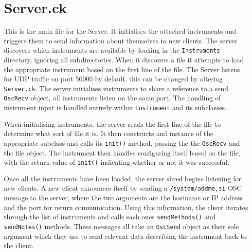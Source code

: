 \documentclass[11pt]{article}
\begin{document}
\section{Server.ck}

This is the main file for the Server. It initialises the attached instruments and triggers them to send information about themselves to new clients.
The server discovers which instruments are available by looking in the \texttt{Instruments} directory, ignoring all subdirectories. When it discovers
a file it attempts to load the appropriate instrument based on the first line of the file. The Server listens for UDP traffic on port 50000 by default, this can be 
changed by altering \texttt{Server.ck}. The server initialises instruments to share a reference to a send \texttt{OscRecv} object, all instruments listen on the same 
port. The handling of instrument input is handled entirely within \texttt{Instrument} and its subclasses. 

When initialising instruments, the server reads the first line of the file to determine what sort of file it is. It then constructs and instance of the appropriate subclass
and calls its \texttt{init()} method, passing the the \texttt{OscRecv} and the file object. The instrument then handles configuring itself based on the file, with the 
return value of \texttt{init()} indicating whether or not it was successful.

Once all the instruments have been loaded, the server shred begins listening for new clients. A new client announces itself by sending a \texttt{/system/addme,si} 
OSC message to the server, where the two arguments are the hostname or IP address and the port for return communication. Using this information, the client 
iterates through the list of instruments and calls each ones \texttt{sendMethods()} and \texttt{sendNotes()} methods. These messages all take an \texttt{OscSend}
object as their sole argument which they use to send relevant data describing the instrument back to the client.
\end{document}
